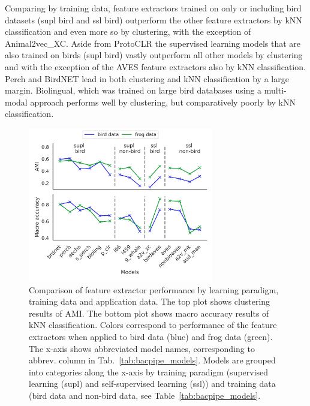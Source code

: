 Comparing by training data, feature extractors trained on only or including bird datasets (supl bird and ssl bird) outperform the other feature extractors by kNN classification and even more so by clustering, with the exception of Animal2vec\_XC.
Aside from ProtoCLR the supervised learning models that are also trained on birds (supl bird) vastly outperform all other models by clustering and with the exception of the AVES feature extractors also by kNN classification.
Perch and BirdNET lead in both clustering and kNN classification by a large margin.
Biolingual, which was trained on large bird databases using a multi-modal approach performs well by clustering, but comparatively poorly by kNN classification.

\begin{figure}[ht]
    \centerline{{
    \includegraphics[width=8.1cm]{Sections/imgs/clust_and_class_lineplots.png}}}
    \caption{Comparison of feature extractor performance by learning paradigm, training data and application data. 
    The top plot shows clustering results of AMI.
    The bottom plot shows macro accuracy results of kNN classification. 
    Colors correspond to performance of the feature extractors when applied to bird data (blue) and frog data (green).
    The x-axis shows abbreviated model names, corresponding to abbrev. column in Tab.~\ref{tab:bacpipe_models}. 
    Models are grouped into categories along the x-axis by training paradigm (supervised learning (supl) and self-supervised learning (ssl)) and training data (bird data and non-bird data, see Table~\ref{tab:bacpipe_models}.}
    \label{fig:orig_vs_ump}
\end{figure}


